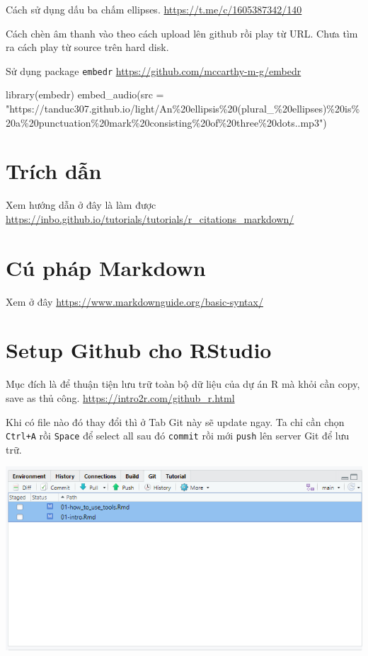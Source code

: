 \documentclass[
]{book}
\newenvironment{Shaded}{\begin{snugshade}}{\end{snugshade}}
\newcommand{\AttributeTok}[1]{\textcolor[rgb]{0.77,0.63,0.00}{#1}}
\newcommand{\FunctionTok}[1]{\textcolor[rgb]{0.00,0.00,0.00}{#1}}
\newcommand{\NormalTok}[1]{#1}
\newcommand{\StringTok}[1]{\textcolor[rgb]{0.31,0.60,0.02}{#1}}
\begin{document}
Cách sử dụng dấu ba chấm ellipses. \url{https://t.me/c/1605387342/140}

Cách chèn âm thanh vào theo cách upload lên github rồi play từ URL. Chưa tìm ra cách play từ source trên hard disk.

Sử dụng package \texttt{embedr} \url{https://github.com/mccarthy-m-g/embedr}

\begin{Shaded}
\begin{Highlighting}[]
\FunctionTok{library}\NormalTok{(embedr)}
\FunctionTok{embed\_audio}\NormalTok{(}\AttributeTok{src =} \StringTok{"https://tanduc307.github.io/light/An\%20ellipsis\%20(plural\_\%20ellipses)\%20is\%20a\%20punctuation\%20mark\%20consisting\%20of\%20three\%20dots..mp3"}\NormalTok{)}
\end{Highlighting}
\end{Shaded}

\hypertarget{truxedch-dux1eabn}{%
\section{Trích dẫn}\label{truxedch-dux1eabn}}

Xem hướng dẫn ở đây là làm được \url{https://inbo.github.io/tutorials/tutorials/r_citations_markdown/}

\hypertarget{cuxfa-phuxe1p-markdown}{%
\section{Cú pháp Markdown}\label{cuxfa-phuxe1p-markdown}}

Xem ở đây \url{https://www.markdownguide.org/basic-syntax/}

\hypertarget{setup-github-cho-rstudio}{%
\section{Setup Github cho RStudio}\label{setup-github-cho-rstudio}}

Mục đích là để thuận tiện lưu trữ toàn bộ dữ liệu của dự án R mà khỏi cần copy, save as thủ công. \url{https://intro2r.com/github_r.html}

Khi có file nào đó thay đổi thì ở Tab Git này sẽ update ngay. Ta chỉ cần chọn \texttt{Ctrl+A} rồi \texttt{Space} để select all sau đó \texttt{commit} rồi mới \texttt{push} lên server Git để lưu trữ.

\includegraphics{01-how_to_use_tools_insertimage_1.png}
\end{document}

